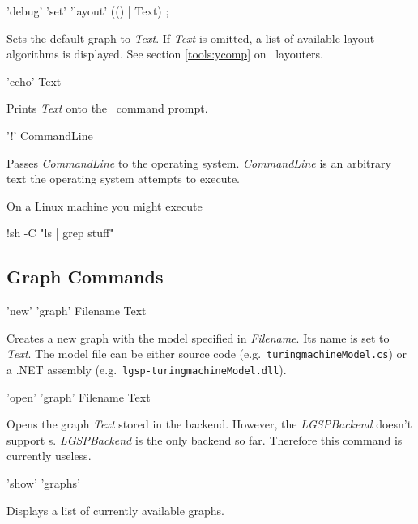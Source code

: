 \begin{rail}
  'debug' 'set' 'layout' (() | Text) ;
\end{rail}
Sets the default graph  to \emph{Text}. If \emph{Text} is omitted, a list of available layout algorithms is displayed. See section \ref{tools:ycomp} on \yComp\ layouters.

\begin{rail}
  'echo' Text
\end{rail}
Prints \emph{Text} onto the \GrShell\ command prompt.

\begin{rail}
  '!' CommandLine
\end{rail}
Passes \emph{CommandLine} to the operating system. \emph{CommandLine} is an arbitrary text the operating system attempts to execute.
\begin{example}
On a Linux machine you might execute
\begin{grshell}
!sh -C "ls | grep stuff"
\end{grshell}
\end{example}

\subsection{Graph Commands}
\label{graphcommands}

\begin{rail}
  'new' 'graph' Filename Text 
\end{rail}
Creates a new graph with the model specified in \emph{Filename}. Its name is set to \emph{Text}. The model file can be either source code (e.g.\ \texttt{turing\textunderscore machineModel.cs}) or a .NET assembly (e.g.\ \texttt{lgsp-turing\textunderscore machineModel.dll}).

\begin{rail}
  'open' 'graph' Filename Text
\end{rail}
Opens the graph \emph{Text} stored in the backend. However, the \emph{LGSPBackend} doesn't support s. \emph{LGSPBackend} is the only backend so far. Therefore this command is currently useless.

\begin{rail}
  'show' 'graphs'
\end{rail}
Displays a list of currently available graphs.

